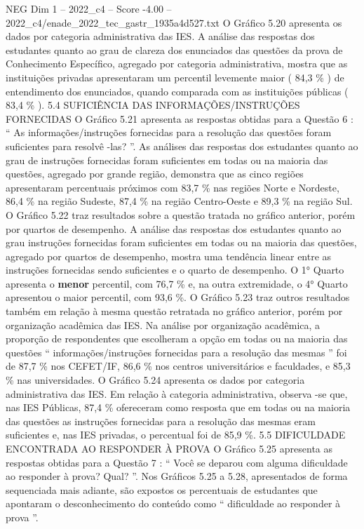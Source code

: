 \begin{textsample}{NEG Dim 1 – 2022\_c4 – Score -4.00 – 2022\_c4/enade\_2022\_tec\_gastr\_1935a4d527.txt}
O Gráfico 5.20 apresenta os dados por categoria administrativa das IES.
A análise das respostas dos estudantes quanto ao grau de clareza dos enunciados das questões da prova de Conhecimento Específico, agregado por categoria administrativa, mostra que as instituições privadas apresentaram um percentil levemente maior ( 84,3 \% ) de entendimento dos enunciados, quando comparada com as instituições públicas ( 83,4 \% ). 5.4 SUFICIÊNCIA DAS INFORMAÇÕES/INSTRUÇÕES FORNECIDAS O Gráfico 5.21 apresenta as respostas obtidas para a Questão 6 : “ As informações/instruções fornecidas para a resolução das questões foram suficientes para resolvê -las? ”.
As análises das respostas dos estudantes quanto ao grau de instruções fornecidas foram suficientes em todas ou na maioria das questões, agregado por grande região, demonstra que as cinco regiões apresentaram percentuais próximos com 83,7 \% nas regiões Norte e Nordeste, 86,4 \% na região Sudeste, 87,4 \% na região Centro-Oeste e 89,3 \% na região Sul.
O Gráfico 5.22 traz resultados sobre a questão tratada no gráfico anterior, porém por quartos de desempenho.
A análise das respostas dos estudantes quanto ao grau instruções fornecidas foram suficientes em todas ou na maioria das questões, agregado por quartos de desempenho, mostra uma tendência linear entre as instruções fornecidas sendo suficientes e o quarto de desempenho.
O 1{\EmojiFont °} Quarto apresenta o \textbf{menor} percentil, com 76,7 \% e, na outra extremidade, o 4{\EmojiFont °} Quarto apresentou o maior percentil, com 93,6 \%.
O Gráfico 5.23 traz outros resultados também em relação à mesma questão retratada no gráfico anterior, porém por organização acadêmica das IES.
Na análise por organização acadêmica, a proporção de respondentes que escolheram a opção em todas ou na maioria das questões “ informações/instruções fornecidas para a resolução das mesmas ” foi de 87,7 \% nos CEFET/IF, 86,6 \% nos centros universitários e faculdades, e 85,3 \% nas universidades.
O Gráfico 5.24 apresenta os dados por categoria administrativa das IES.
Em relação à categoria administrativa, observa -se que, nas IES Públicas, 87,4 \% ofereceram como resposta que em todas ou na maioria das questões as instruções fornecidas para a resolução das mesmas eram suficientes e, nas IES privadas, o percentual foi de 85,9 \%. 5.5 DIFICULDADE ENCONTRADA AO RESPONDER À PROVA O Gráfico 5.25 apresenta as respostas obtidas para a Questão 7 : “ Você se deparou com alguma dificuldade ao responder à prova?
Qual? ”.
Nos Gráficos 5.25 a 5.28, apresentados de forma sequenciada mais adiante, são expostos os percentuais de estudantes que apontaram o desconhecimento do conteúdo como “ dificuldade ao responder à prova ”.

\end{textsample}
